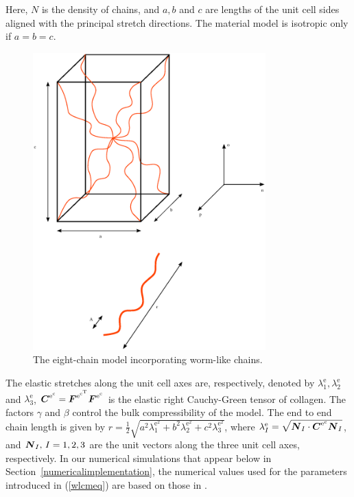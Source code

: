 Here, $N$ is
the density of chains, and $a,b$ and $c$ are lengths of the unit cell
sides aligned with the principal stretch directions. The material
model is isotropic only if $a=b=c$.

\begin{figure}
  \centering
  \includegraphics[width=0.8\textwidth]{images/elucidation/wlcm-cuboid}
  \caption{The eight-chain model incorporating worm-like chains.}
  \label{eight-chain-model}
\end{figure}

The elastic stretches along the unit cell axes are, respectively,
denoted by
$\lambda_1^{\mathrm{e}},
\lambda_2^{\mathrm{e}}$ 
and 
$\lambda_3^{\mathrm{e}}$, $\mbox{\boldmath$ C$}^{\mathrm{e}^{\mathrm{c}}} =
\mbox{\boldmath$ F$}^{\mathrm{e}^{\mathrm{c}^{\mathrm{T}}}}
\mbox{\boldmath$ F$}^{\mathrm{e}^{\mathrm{c}}}$ is the elastic right Cauchy-Green
tensor of collagen. The factors $\gamma$ and $\beta$ control
the bulk compressibility of the model. The end to end chain length is
given by $r = \frac{1}{2}\sqrt{a^2\lambda_1^{\mathrm{e}^2} +
  b^2\lambda_2^{\mathrm{e}^2}+c^2\lambda_3^{\mathrm{e}^2}}$, where
$\lambda^\mathrm{e}_I = 
\sqrt{\mbox{\boldmath$ N$}_I\cdot\mbox{\boldmath$ C$}^{\mathrm{e}^{\mathrm{c}}}\mbox{\boldmath$ N$}_I}$, and $\mbox{\boldmath$ N$}_I,\,I =
1,2,3$ are the unit vectors along the three unit cell axes,
respectively. In our numerical simulations that appear below in
Section~\ref{numericalimplementation}, the numerical values used for
the parameters introduced in (\ref{wlcmeq}) are based on those in
\citet{kuhlremod05}.

